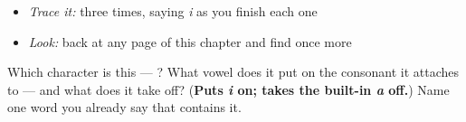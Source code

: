 \begin{itemize}
\raggedright
  \item \emph{Trace it:}  three times, saying \emph{i} as you finish each one
  \item \emph{Look:} back at any page of this chapter and find  once more
\end{itemize}

\begin{tcolorbox}[breakable,colback=teal!4,colframe=teal!35!black,title={Before you move on}]
Which character is this — ? What vowel does it put on the consonant it attaches to — and what does it take off? (\textbf{Puts \emph{i} on; takes the built-in \emph{a} off.}) Name one word you already say that contains it.
\end{tcolorbox}
